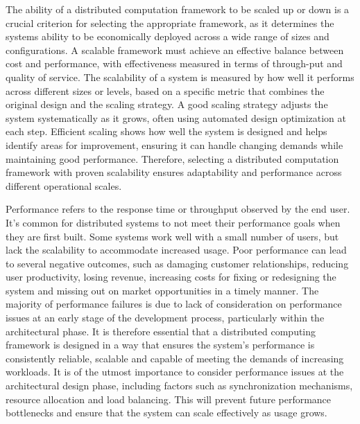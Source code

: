 The ability of a distributed computation framework to be scaled up or down is a crucial criterion for selecting the appropriate framework, as it determines the systems ability to be economically deployed across a wide range of sizes and configurations. A scalable framework must achieve an effective balance between cost and performance, with effectiveness measured in terms of through-put and quality of service. The scalability of a system is measured by how well it performs across different sizes or levels, based on a specific metric that combines the original design and the scaling strategy. A good scaling strategy adjusts the system systematically as it grows, often using automated design optimization at each step. Efficient scaling shows how well the system is designed and helps identify areas for improvement, ensuring it can handle changing demands while maintaining good performance. Therefore, selecting a distributed computation framework with proven scalability ensures adaptability and performance across different operational scales. \cite{jogalekar2000evaluating}

Performance refers to the response time or throughput observed by the end user. It's common for distributed systems to not meet their performance goals when they are first built. Some systems work well with a small number of users, but lack the scalability to accommodate increased usage. Poor performance can lead to several negative outcomes, such as damaging customer relationships, reducing user productivity, losing revenue, increasing costs for fixing or redesigning the system and missing out on market opportunities in a timely manner. The majority of performance failures is due to lack of consideration on performance issues at an early stage of the development process, particularly within the architectural phase. It is therefore essential that a distributed computing framework is designed in a way that ensures the system's performance is consistently reliable, scalable and capable of meeting the demands of increasing workloads. It is of the utmost importance to consider performance issues at the architectural design phase, including factors such as synchronization mechanisms, resource allocation and load balancing. This will prevent future performance bottlenecks and ensure that the system can scale effectively as usage grows. \cite{smith2002performance}


